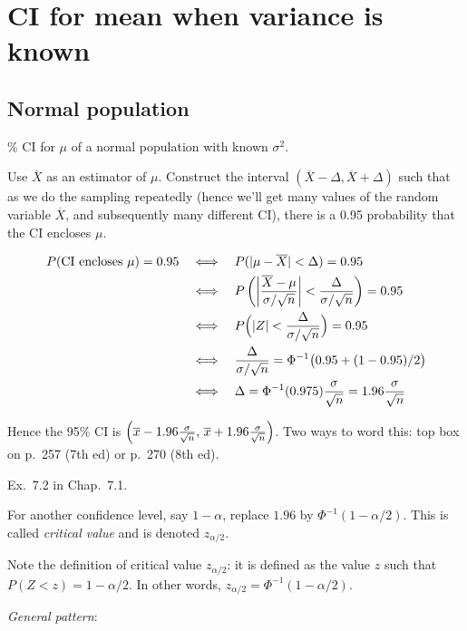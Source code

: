 \documentclass[12pt]{article}
\begin{document}
\section{CI for mean when variance is known}

\subsection{Normal population}

\% CI for $\mu$ of a normal population with known $\sigma^2$.

Use $\overline{X}$ as an estimator of $\mu$.
Construct the interval $(\overline{X} - \Delta, \overline{X} + \Delta)$
such that as we do the sampling repeatedly (hence we'll get many values
of the random variable $\overline{X}$, and subsequently many different
CI), there is a 0.95 probability that the CI encloses $\mu$.

\begin{align*}
P(\text{CI encloses $\mu$}) = 0.95\quad
&\Longleftrightarrow\quad
    P(|\mu - \overline{X}| < \Delta) = 0.95
\\
&\Longleftrightarrow\quad
    P\left(\left|\frac{\overline{X} - \mu}{\sigma/\sqrt{n}} \right| <
        \frac{\Delta}{\sigma/\sqrt{n}} \right) = 0.95
\\
&\Longleftrightarrow\quad
    P\Bigl(|Z| < \frac{\Delta}{\sigma/\sqrt{n}}\Bigr) = 0.95
\\
&\Longleftrightarrow\quad
    \frac{\Delta}{\sigma/\sqrt{n}} = \Phi^{-1}\bigl(0.95 + (1-0.95)/2\bigr)
\\
&\Longleftrightarrow\quad
    \Delta = \Phi^{-1}(0.975) \frac{\sigma}{\sqrt{n}}
            = 1.96\frac{\sigma}{\sqrt{n}}
\end{align*}

Hence the 95\% CI is
$\Bigl(
    \overline{x} - 1.96\frac{\sigma}{\sqrt{n}},\,
    \overline{x} + 1.96\frac{\sigma}{\sqrt{n}}
\Bigr)$.
Two ways to word this: top box on p.~257 (7th ed) or p.~270 (8th ed).

\example
Ex.~7.2 in Chap.~7.1.

For another confidence level, say $1 - \alpha$,
replace $1.96$ by $\Phi^{-1}(1 - \alpha/2)$.
This is called \emph{critical value} and is denoted $z_{\alpha/2}$.

Note the definition of critical value $z_{\alpha/2}$:
it is defined as the value $z$ such that $P(Z < z) = 1 - \alpha/2$.
In other words, $z_{\alpha/2} = \Phi^{-1}(1 - \alpha/2)$.

\emph{General pattern}:
\end{document}
